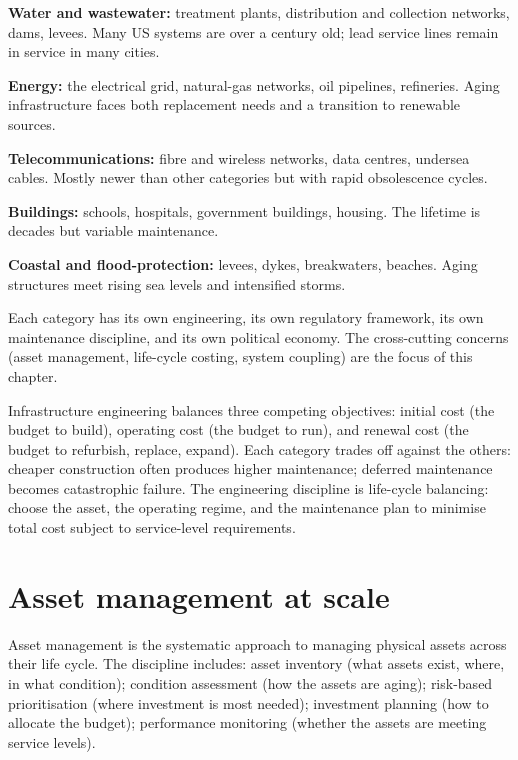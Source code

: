\textbf{Water and wastewater:} treatment plants, distribution and collection networks, dams, levees. Many US systems are over a century old; lead service lines remain in service in many cities.

\textbf{Energy:} the electrical grid, natural-gas networks, oil pipelines, refineries. Aging infrastructure faces both replacement needs and a transition to renewable sources.

\textbf{Telecommunications:} fibre and wireless networks, data centres, undersea cables. Mostly newer than other categories but with rapid obsolescence cycles.

\textbf{Buildings:} schools, hospitals, government buildings, housing. The lifetime is decades but variable maintenance.

\textbf{Coastal and flood-protection:} levees, dykes, breakwaters, beaches. Aging structures meet rising sea levels and intensified storms.

Each category has its own engineering, its own regulatory framework, its own maintenance discipline, and its own political economy. The cross-cutting concerns (asset management, life-cycle costing, system coupling) are the focus of this chapter.

\begin{archetype}
Infrastructure engineering balances three competing objectives: initial cost (the budget to build), operating cost (the budget to run), and renewal cost (the budget to refurbish, replace, expand). Each category trades off against the others: cheaper construction often produces higher maintenance; deferred maintenance becomes catastrophic failure. The engineering discipline is life-cycle balancing: choose the asset, the operating regime, and the maintenance plan to minimise total cost subject to service-level requirements.
\end{archetype}

\section{Asset management at scale}

Asset management is the systematic approach to managing physical assets across their life cycle. The discipline includes: asset inventory (what assets exist, where, in what condition); condition assessment (how the assets are aging); risk-based prioritisation (where investment is most needed); investment planning (how to allocate the budget); performance monitoring (whether the assets are meeting service levels).

